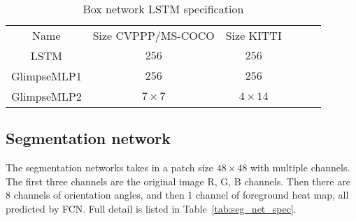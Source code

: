 \begin{table}[h!]
\caption{Box network LSTM specification}
\label{tab:box_lstm_spec}
\centering
\begin{small}
\begin{tabular}{cccccc}
Name        & Size CVPPP/MS-COCO     & Size KITTI  \\
LSTM        & $256$                  & $256$       \\
GlimpseMLP1 & $256$                  & $256$       \\
GlimpseMLP2 & $7\times7$             & $4\times14$ \\
\end{tabular}
\end{small}
\end{table}

\subsection{Segmentation network}

The segmentation networks takes in a patch size $48\times48$ with multiple
channels. The first three channels are the original image R, G, B channels.
Then there are 8 channels of orientation angles, and then 1 channel of
foreground heat map, all predicted by FCN. Full detail is listed in
Table~\ref{tab:seg_net_spec}.

